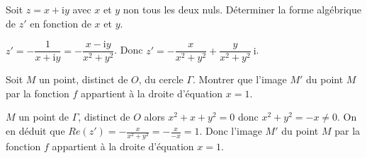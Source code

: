 \documentclass[a4paper,11pt]{article} %
\numberwithin{equation}{section} %
\numberwithin{figure}{section} %
\theoremstyle{plain} %
\theoremstyle{definition} %
\theoremstyle{remark} %
\begin{document}
Soit $z = x + \text{i}y$ avec $x$ et $y$ non tous les deux nuls. Déterminer la forme algébrique de $z'$ en fonction de $x$ et $y$.


$z'=-\dfrac{1}{x+\text{i}y}=-\dfrac{x-\text{i}y}{x^2+y^2}$. Donc $z'=-\dfrac{x}{x^2+y^2}+\dfrac{y}{x^2+y^2}~\text{i}$.
	
	
Soit $M$ un point, distinct de $O$, du cercle $\Gamma$. Montrer que l'image $M'$ du point $M$ par la fonction $f$ appartient à la droite d'équation $x = 1$.


$M$ un point de $\Gamma$, distinct de $O$ alors $x^2 + x + y^2 = 0$ donc $x^2+y^2=-x\neq0$. On en déduit que $Re\left(z'\right) = -\frac{x}{x^2+y^2}=-\frac{x}{-x}=1$. Donc l'image $M'$ du point $M$ par la fonction $f$ appartient à la droite d'équation $x = 1$.
\end{document}
